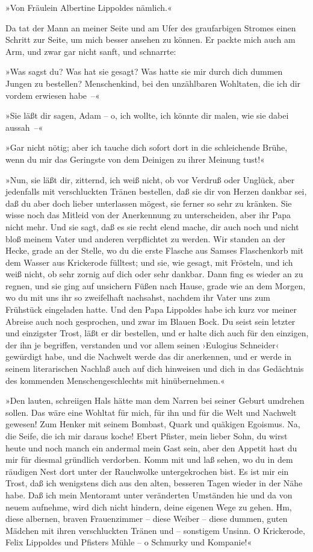 »Von Fräulein Albertine Lippoldes nämlich.«

Da tat der Mann an meiner Seite und am Ufer des graufarbigen
Stromes einen Schritt zur Seite, um mich besser ansehen zu können.
Er packte mich auch am Arm, und zwar gar nicht sanft, und
schnarrte:

»Was sagst du? Was hat sie gesagt? Was hatte sie mir durch dich
dummen Jungen zu bestellen? Menschenkind, bei den unzählbaren
Wohltaten, die ich dir vordem erwiesen habe~–«

»Sie läßt dir sagen, Adam – o, ich wollte, ich könnte dir malen,
wie sie dabei aussah~–«

»Gar nicht nötig; aber ich tauche dich sofort dort in die
schleichende Brühe, wenn du mir das Geringste von dem Deinigen zu
ihrer Meinung tust!«

»Nun, sie läßt dir, zitternd, ich weiß nicht, ob vor Verdruß oder
Unglück, aber jedenfalls mit verschluckten Tränen bestellen, daß
sie dir von Herzen dankbar sei, daß du aber doch lieber unterlassen
mögest, sie ferner so sehr zu kränken. Sie wisse noch das Mitleid
von der Anerkennung zu unterscheiden, aber ihr Papa nicht mehr. Und
sie sagt, daß es sie recht elend mache, dir auch noch und nicht
bloß meinem Vater und anderen verpflichtet zu werden. Wir standen
an der Hecke, grade an der Stelle, wo du die erste Flasche aus
Samses Flaschenkorb mit dem Wasser aus Krickerode fülltest; und
sie, wie gesagt, mit Frösteln, und ich weiß nicht, ob sehr zornig
auf dich oder sehr dankbar. Dann fing es wieder an zu regnen, und
sie ging auf unsichern Füßen nach Hause, grade wie an dem Morgen,
wo du mit uns ihr so zweifelhaft nachsahst, nachdem ihr Vater uns
zum Frühstück eingeladen hatte. Und den Papa Lippoldes habe ich
kurz vor meiner Abreise auch noch gesprochen, und zwar im Blauen
Bock. Du seist sein letzter und einzigster Trost, läßt er dir
bestellen, und er halte dich auch für den einzigen, der ihn je
begriffen, verstanden und vor allem seinen ›Eulogius Schneider‹
gewürdigt habe, und die Nachwelt werde das dir anerkennen, und er
werde in seinem literarischen Nachlaß auch auf dich hinweisen und
dich in das Gedächtnis des kommenden Menschengeschlechts mit
hinübernehmen.«

»Den lauten, schreiigen Hals hätte man dem Narren bei seiner Geburt
umdrehen sollen. Das wäre eine Wohltat für mich, für ihn und für
die Welt und Nachwelt gewesen! Zum Henker mit seinem Bombast, Quark
und quäkigen Egoismus. Na, die Seife, die ich mir daraus koche!
Ebert Pfister, mein lieber Sohn, du wirst heute und noch manch ein
andermal mein Gast sein, aber den Appetit hast du mir für diesmal
gründlich verdorben. Komm mit und laß sehen, wo du in dem räudigen
Nest dort unter der Rauchwolke untergekrochen bist. Es ist mir ein
Trost, daß ich wenigstens dich aus den alten, besseren Tagen wieder
in der Nähe habe. Daß ich mein Mentoramt unter veränderten
Umständen hie und da von neuem aufnehme, wird dich nicht hindern,
deine eigenen Wege zu gehen. Hm, diese albernen, braven
Frauenzimmer – diese Weiber – diese dummen, guten Mädchen mit ihren
verschluckten Tränen und – sonstigem Unsinn. O Krickerode, Felix
Lippoldes und Pfisters Mühle – o Schmurky und Kompanie!«

